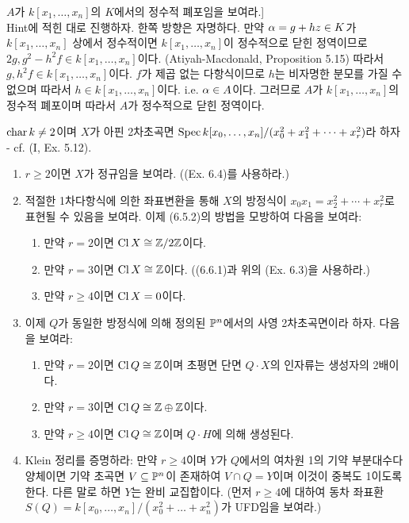 \begin{enumerate}[label=\tb{6.\arabic*.},itemindent=0mm,itemsep=4mm]
	$A$가 $k[x_1,\ldots,x_n]$의 $K$에서의 정수적 폐포임을 보여라.]\\
	\sol Hint에 적힌 대로 진행하자. 한쪽 방향은 자명하다.
	만약 $\alpha=g+hz\in K$가 $k[x_1,\ldots,x_n]$ 상에서 정수적이면
	$k[x_1,\ldots,x_n]$이 정수적으로 닫힌 정역이므로 $2g,g^2-h^2f\in k[x_1,\ldots,x_n]$이다. (Atiyah-Macdonald, Proposition 5.15)
	따라서 $g,h^2f\in k[x_1,\ldots,x_n]$이다.
	$f$가 제곱 없는 다항식이므로 $h$는 비자명한 분모를 가질 수 없으며 따라서 $h\in k[x_1,\ldots,x_n]$이다.
	i.e. $\alpha\in A$이다. 그러므로 $A$가 $k[x_1,\ldots,x_n]$의 정수적 폐포이며 따라서 $A$가 정수적으로 닫힌 정역이다.
	{\renewcommand{\labelenumi}{\tb{*6.\arabic{enumi}.}}
	\item {} $\operatorname{char} k\ne 2$이며 $X$가 아핀 2차초곡면 $\operatorname{Spec} k[x_0,\ldots,x_n]/(x_0^2+x_1^2+\cdots+x_r^2)$라 하자
	- cf. (I, Ex. 5.12).
	\begin{enumerate}[label=(\alph*)]
	\item $r\ge 2$이면 $X$가 정규임을 보여라. ((Ex. 6.4)를 사용하라.)
	\item 적절한 1차다항식에 의한 좌표변환을 통해 $X$의 방정식이 $x_0x_1=x_2^2+\cdots+x_r^2$로 표현될 수 있음을 보여라.
	이제 (6.5.2)의 방법을 모방하여 다음을 보여라:
	\begin{enumerate}[label=(\arabic*)]
	\item 만약 $r=2$이면 $\operatorname{Cl} X\cong\mathbb Z/2\mathbb Z$이다.
	\item 만약 $r=3$이면 $\operatorname{Cl} X\cong\mathbb Z$이다. ((6.6.1)과 위의 (Ex. 6.3)을 사용하라.)
	\item 만약 $r\ge 4$이면 $\operatorname{Cl} X=0$이다.
	\end{enumerate}
	\item 이제 $Q$가 동일한 방정식에 의해 정의된 $\mathbb{P}^n$에서의 사영 2차초곡면이라 하자. 다음을 보여라:
	\begin{enumerate}[label=(\arabic*)]
	\item 만약 $r=2$이면 $\operatorname{Cl} Q\cong\mathbb Z$이며 초평면 단면 $Q\cdot X$의 인자류는 생성자의 2배이다.
	\item 만약 $r=3$이면 $\operatorname{Cl} Q\cong\mathbb Z\oplus\mathbb Z$이다.
	\item 만약 $r\ge 4$이면 $\operatorname{Cl} Q\cong\mathbb Z$이며 $Q\cdot H$에 의해 생성된다.
	\end{enumerate}
	\item Klein 정리를 증명하라: 만약 $r\ge 4$이며 $Y$가 $Q$에서의 여차원 1의 기약 부분대수다양체이면
	기약 초곡면 $V\subseteq\mathbb{P}^n$이 존재하여 $V\cap Q=Y$이며 이것이 중복도 1이도록 한다. 다른 말로 하면 $Y$는 완비 교집합이다.
	(먼저 $r\ge 4$에 대하여 동차 좌표환 $S(Q)=k[x_0,\ldots,x_n]/(x_0^2+\ldots+x_n^2)$가 UFD임을 보여라.)

\end{enumerate}}
\end{enumerate}
